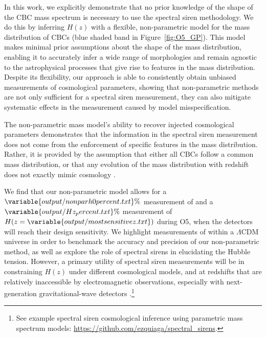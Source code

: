 \documentclass[preprint2,linenumbers]{aastex631}
\begin{document}
In this work, we explicitly demonstrate that no prior knowledge of the shape of the \ac{CBC} mass spectrum is necessary to use the spectral siren methodology. 
We do this by inferring $H(z)$ with a flexible, non-parametric model for the mass distribution of \acp{CBC} (blue shaded band in Figure~\ref{fig:O5_GP}). 
This model makes minimal prior assumptions about the shape of the mass distribution, enabling it to accurately infer a wide range of morphologies and remain agnostic to the astrophysical processes that give rise to features in the mass distribution.
Despite its flexibility, our approach is able to consistently obtain unbiased measurements of cosmological parameters, showing that non-parametric methods are not only sufficient for a spectral siren measurement, they can also mitigate systematic effects in the measurement caused by model misspecification.

The non-parametric mass model's ability to recover injected cosmological parameters demonstrates that the information in the spectral siren measurement does not come from the enforcement of specific features in the mass distribution.
Rather, it is provided by the assumption that either all \acp{CBC} follow a common mass distribution, or that any evolution of the mass distribution with redshift does not exactly mimic cosmology \citep{ezquiaga_spectral_2022}.

We find that our non-parametric model allows for a $\variable{output/nonparh0percent.txt}\%$ measurement of \Ho{} and a $\variable{output/Hz_percent.txt}\%$ measurement of $H(z=\variable{output/mostsensitivez.txt})$ during \ac{O5}, when the detectors will reach their design sensitivity. 
We highlight measurements of \Ho{} within a $\Lambda$CDM universe in order to benchmark the accuracy and precision of our non-parametric method, as well as explore the role of spectral sirens in elucidating the Hubble tension.
However, a primary utility of spectral siren measurements will be in constraining $H(z)$ under different cosmological models, and at redshifts that are relatively inaccessible by electromagnetic observations, especially with next-generation gravitational-wave detectors \citep{You:2020wju, Ezquiaga:2020tns, ezquiaga_spectral_2022, Chen:2024gdn}.\footnote{See example spectral siren cosmological inference using parametric mass spectrum models: \href{https://github.com/ezquiaga/spectral_sirens}{https://github.com/ezquiaga/spectral\_sirens}.}
\end{document}
